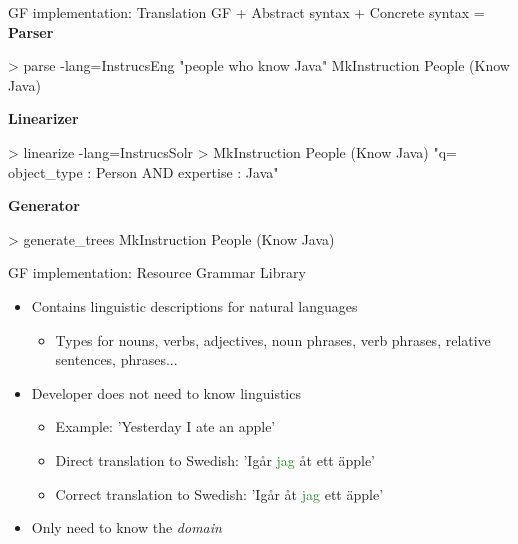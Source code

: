 \begin{frame}[fragile]{GF implementation: Translation}
GF + Abstract syntax + Concrete syntax = \pause
\newline
\newline
\textbf{Parser}
\begin{semiverbatim}
> parse -lang=InstrucsEng \textcolor{String}{\textcolor{String}{"people who know Java"}}
MkInstruction People (Know Java)
\end{semiverbatim} \pause
\textbf{Linearizer}
\begin{semiverbatim}
> linearize -lang=InstrucsSolr 
>                  MkInstruction People (Know Java)
\textcolor{String}{"q= object_type : Person AND expertise : Java"}
\end{semiverbatim} \pause
\textbf{Generator}
\begin{semiverbatim}
> generate_trees
MkInstruction People (Know Java)
\end{semiverbatim}
\end{frame}
\begin{frame}[fragile]{GF implementation: Resource Grammar Library}\pause
\begin{itemize}
\item Contains linguistic descriptions for natural languages\pause
  \begin{itemize}
    \item Types for nouns, verbs, adjectives, noun phrases, verb phrases, relative sentences, phrases...\pause
  \end{itemize}
  \item Developer does not need to know linguistics\pause
  \begin{itemize}
      \item Example: 'Yesterday I ate an apple' \pause
      \item Direct translation to Swedish: 'Ig{\aa}r \textcolor{ForestGreen}{jag} \textcolor{String}{{\aa}t} ett {\"a}pple' \pause
      \item Correct translation to Swedish: 'Ig{\aa}r \textcolor{String}{{\aa}t} \textcolor{ForestGreen}{jag} ett {\"a}pple' \pause
      \end{itemize}
  \item Only need to know the \emph{domain}
\end{itemize}
\end{frame}
